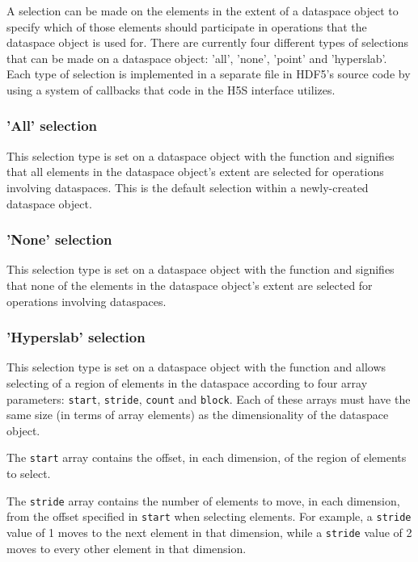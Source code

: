 \documentclass[../HDF5_RFC.tex]{subfiles}
\begin{document}
A selection can be made on the elements in the extent of a dataspace object to specify
which of those elements should participate in operations that the dataspace object
is used for. There are currently four different types of selections that can be made
on a dataspace object: 'all', 'none', 'point' and 'hyperslab'. Each type of selection
is implemented in a separate file in HDF5's source code by using a system of callbacks
that code in the H5S interface utilizes.

\subsubsection{'All' selection}

This selection type is set on a dataspace object with the 
function and signifies that all elements in the dataspace object's extent are selected
for operations involving dataspaces. This is the default selection within a newly-created
dataspace object.

\subsubsection{'None' selection}

This selection type is set on a dataspace object with the 
function and signifies that none of the elements in the dataspace object's extent are
selected for operations involving dataspaces.

\subsubsection{'Hyperslab' selection}

This selection type is set on a dataspace object with the 
function and allows selecting of a region of elements in the dataspace according to
four array parameters: \texttt{start}, \texttt{stride}, \texttt{count} and \texttt{block}.
Each of these arrays must have the same size (in terms of array elements) as the
dimensionality of the dataspace object.

The \texttt{start} array contains the offset, in each dimension, of the region of
elements to select.

The \texttt{stride} array contains the number of elements to move, in each dimension,
from the offset specified in \texttt{start} when selecting elements. For example, a
\texttt{stride} value of 1 moves to the next element in that dimension, while a
\texttt{stride} value of 2 moves to every other element in that dimension.
\end{document}
